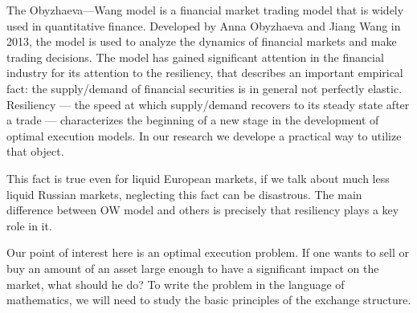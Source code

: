 \introduction %

The Obyzhaeva—Wang model is a financial market trading model that is widely used in quantitative finance. 
Developed by Anna Obyzhaeva and Jiang Wang in 2013, the model is used to analyze the dynamics of financial 
markets and make trading decisions. The model has gained significant attention in the financial industry 
for its attention to the resiliency, that describes an important empirical fact: the supply/demand of 
financial securities is in general not perfectly elastic. Resiliency --- the speed at which supply/demand 
recovers to its steady state after a trade --- characterizes the beginning of a new stage in the development 
of optimal execution models. In our research we develope a practical way to utilize that object. 
\par
This fact is true even for liquid European markets, if we talk about much less liquid Russian markets, 
neglecting this fact can be disastrous. The main difference between OW model and others is precisely 
that resiliency plays a key role in it. 
\par
Our point of interest here is an optimal execution problem. If one wants to sell or buy an amount of an asset 
large enough to have a significant impact on the market, what should he do? To write the problem in the language 
of mathematics, we will need to study the basic principles of the exchange structure. 


